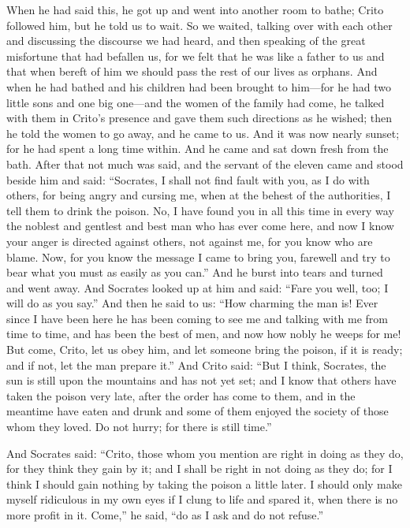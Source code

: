 \documentclass[letterpaper,12pt]{article}
\newcommand{\stephpag}[1]{\marginnote{\small\itshape\fontfamily{ppl}\selectfont #1}}
\begin{document}
\begin{drama}
When he had said this, he got up and went into another room to bathe; Crito followed him, but he told us to wait. So we waited, talking over with each other and discussing the discourse we had heard, and then speaking of the great misfortune that had befallen us, for we felt that he was like a father to us and that when bereft of him we should pass the rest of our lives as orphans. And when he had bathed \stephpag{b} and his children had been brought to him---for he had two little sons and one big one---and the women of the family had come, he talked with them in Crito's presence and gave them such directions as he wished; then he told the women to go away, and he came to us. And it was now nearly sunset; for he had spent a long time within. And he came and sat down fresh from the bath. After that not much was said, and the servant \stephpag{c} of the eleven came and stood beside him and said: ``Socrates, I shall not find fault with you, as I do with others, for being angry and cursing me, when at the behest of the authorities, I tell them to drink the poison. No, I have found you in all this time in every way the noblest and gentlest and best man who has ever come here, and now I know your anger is directed against others, not against me, for you know who are blame. Now, for you know the message I came to bring you, farewell and try to bear what you must \stephpag{d} as easily as you can.'' And he burst into tears and turned and went away. And Socrates looked up at him and said: ``Fare you well, too; I will do as you say.'' And then he said to us: ``How charming the man is! Ever since I have been here he has been coming to see me and talking with me from time to time, and has been the best of men, and now how nobly he weeps for me! But come, Crito, let us obey him, and let someone bring the poison, if it is ready; and if not, let the man prepare it.'' And Crito said: \stephpag{e} ``But I think, Socrates, the sun is still upon the mountains and has not yet set; and I know that others have taken the poison very late, after the order has come to them, and in the meantime have eaten and drunk and some of them enjoyed the society of those whom they loved. Do not hurry; for there is still time.''
 
And Socrates said: ``Crito, those whom you mention are right in doing as they do, for they think they gain by it; and I shall be right in not doing as they do; \stephpag{117 a} for I think I should gain nothing by taking the poison a little later. I should only make myself ridiculous in my own eyes if I clung to life and spared it, when there is no more profit in it. Come,'' he said, ``do as I ask and do not refuse.''
 

\end{drama}
\end{document}

